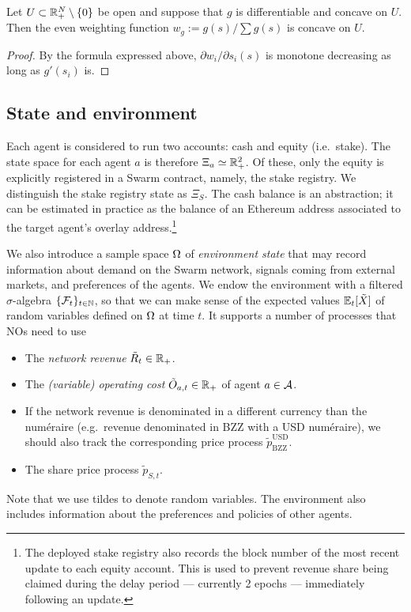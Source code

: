 \begin{lemma}

  Let $U\subset \mathbb{R}_+^N\setminus\{0\}$ be open and suppose that $g$ is differentiable and concave on $U$.
  Then the even weighting function $w_g := g(s)/\sum g(s)$ is concave on $U$.

\end{lemma}
%
\begin{proof}

  By the formula expressed above, $\partial w_i/\partial s_i(s)$ is monotone decreasing as long as $g'(s_i)$ is. \qedhere

\end{proof}

\subsection{State and environment}

Each agent is considered to run two accounts: cash and equity (i.e.~stake).
%
The state space for each agent $a$ is therefore $\Xi_a\simeq\mathbb{R}_+^2$.
%
Of these, only the equity is explicitly registered in a Swarm contract, namely, the stake registry.
%
We distinguish the stake registry state as $\Xi_S$.
%
The cash balance is an abstraction; it can be estimated in practice as the balance of an Ethereum address associated to the target agent's overlay address.\footnote{The deployed stake registry also records the block number of the most recent update to each equity account. This is used to prevent revenue share being claimed during the delay period --- currently 2 epochs --- immediately following an update.}

We also introduce a sample space $\Omega$ of \emph{environment state} that may record information about demand on the Swarm network, signals coming from external markets, and preferences of the agents.
%
We endow the environment with a filtered $\sigma$-algebra $\{\mathcal{F}_t\}_{t\in\mathbb{N}}$, so that we can make sense of the expected values $\mathbb{E}_t[\tilde{X}]$ of random variables defined on $\Omega$ at time $t$.
%
It supports a number of processes that NOs need to use
\begin{itemize}
  \item The \emph{network revenue} $\tilde{R}_t\in \mathbb{R}_+$.
  \item The \emph{(variable) operating cost} $\tilde{O}_{a,t}\in\mathbb{R}_+$ of agent $a\in\mathcal{A}$.
  \item If the network revenue is denominated in a different currency than the num\'eraire (e.g.~revenue denominated in BZZ with a USD num\'eraire), we should also track the corresponding price process $\tilde p_\mathrm{BZZ}^\mathrm{USD}$.
  \item The share price process $\tilde{p}_{S,t}$.
\end{itemize}
Note that we use tildes to denote random variables.
%
The environment also includes information about the preferences and policies of other agents.

